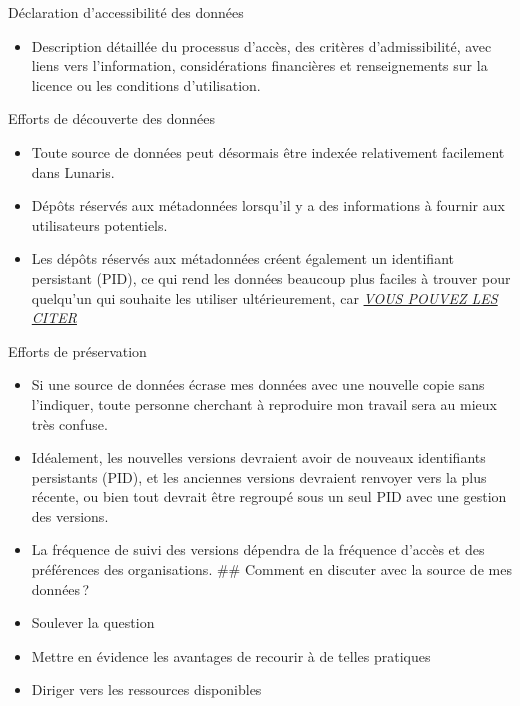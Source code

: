\documentclass[
  ignorenonframetext,
]{beamer}
\providecommand{\tightlist}{%
  \setlength{\itemsep}{0pt}\setlength{\parskip}{0pt}}
\begin{document}
\begin{frame}{Déclaration d'accessibilité des données}
\label{duxe9claration-daccessibilituxe9-des-donnuxe9es}
\begin{itemize}
\tightlist
\item
  Description détaillée du processus d'accès, des critères
  d'admissibilité, avec liens vers l'information, considérations
  financières et renseignements sur la licence ou les conditions
  d'utilisation.
\end{itemize}
\end{frame}

\begin{frame}{Efforts de découverte des données}
\label{efforts-de-duxe9couverte-des-donnuxe9es}
\begin{itemize}
\tightlist
\item
  Toute source de données peut désormais être indexée relativement
  facilement dans Lunaris.
\item
  Dépôts réservés aux métadonnées lorsqu'il y a des informations à
  fournir aux utilisateurs potentiels.
\item
  Les dépôts réservés aux métadonnées créent également un identifiant
  persistant (PID), ce qui rend les données beaucoup plus faciles à
  trouver pour quelqu'un qui souhaite les utiliser ultérieurement, car
  \href{https://guides.library.oregonstate.edu/research-data-services/data-management-data-citation}{\emph{VOUS
  POUVEZ LES CITER}}
\end{itemize}
\end{frame}

\begin{frame}{Efforts de préservation}
\label{efforts-de-pruxe9servation}
\begin{itemize}
\item
  Si une source de données écrase mes données avec une nouvelle copie
  sans l'indiquer, toute personne cherchant à reproduire mon travail
  sera au mieux très confuse.
\item
  Idéalement, les nouvelles versions devraient avoir de nouveaux
  identifiants persistants (PID), et les anciennes versions devraient
  renvoyer vers la plus récente, ou bien tout devrait être regroupé sous
  un seul PID avec une gestion des versions.
\item
  La fréquence de suivi des versions dépendra de la fréquence d'accès et
  des préférences des organisations. \#\# Comment en discuter avec la
  source de mes données\,?
\item
  Soulever la question
\item
  Mettre en évidence les avantages de recourir à de telles pratiques
\item
  Diriger vers les ressources disponibles
\end{itemize}
\end{frame}
\end{document}
